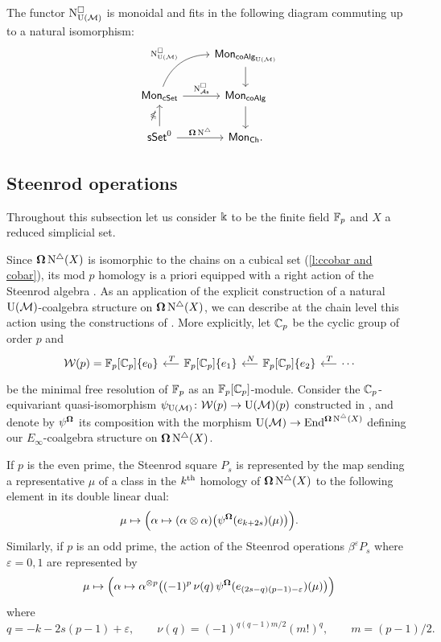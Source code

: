 \begin{lemma} \label{l:lift of cobar to e-infty}
	The functor $\operatorname{N^{\square}_{{\operatorname{U}(\mathcal{M})}}}$ is monoidal and fits in the following diagram commuting up to a natural isomorphism:
	\[
	\begin{tikzcd}
	& \Mon_{\coAlg_\UM} \arrow[d] \\
	\Mon_{\cSet} \arrow[ru, "\cchainsUM", out=70, in=180] \arrow[r, "\cchainsAs"]
	& \Mon_{\coAlg} \arrow[d] \\
	\sSet^0 \arrow[r, "\cobar \schains"] \arrow[u, "\ccobar"]
	& \Mon_{\Ch}.
	\end{tikzcd}
	\]
\end{lemma}

\subsection{Steenrod operations}

Throughout this subsection let us consider $\Bbbk$ to be the finite field ${\mathbb{F}_p}$ and $X$ a reduced simplicial set.

Since $\operatorname{\mathbf{\Omega}} \operatorname{N^{\triangle}}(X)$ is isomorphic to the chains on a cubical set (\cref{l:ccobar and cobar}), its mod $p$ homology is a priori equipped with a right action of the Steenrod algebra \cite{steenrod1962cohomology, milnor1958steenrod}.
As an application of the explicit construction of a natural ${\operatorname{U}(\mathcal{M})}$-coalgebra structure on $\operatorname{\mathbf{\Omega}} \operatorname{N^{\triangle}}(X)$, we can describe at the chain level this action using the constructions of \cite{medina2020maysteenrod}.
More explicitly, let ${\mathbb{C}_p}$ be the cyclic group of order $p$ and
\[
\begin{tikzcd} [column sep = .5cm]
\cW(p) = \Fp[\Cp]\{e_0\} & \arrow[l, "\,T"'] \Fp[\Cp]\{e_1\} & \arrow[l, "\,N"'] \Fp[\Cp]\{e_2\} & \arrow[l, "\,T"'] \dotsb
\end{tikzcd}
\]
be the minimal free resolution of ${\mathbb{F}_p}$ as an ${\mathbb{F}_p}[{\mathbb{C}_p}]$-module.
Consider the ${\mathbb{C}_p}$-equivariant quasi-isomorphism $\psi_{\operatorname{U}(\mathcal{M})} \colon \mathcal{W}(p) \to {\operatorname{U}(\mathcal{M})}(p)$ constructed in \cite{medina2020maysteenrod}, and denote by $\psi^{\operatorname{\mathbf{\Omega}}}$ its composition with the morphism ${\operatorname{U}(\mathcal{M})} \to \mathrm{End}^{\operatorname{\mathbf{\Omega}} \operatorname{N^{\triangle}}(X)}$ defining our $E_\infty$-coalgebra structure on $\operatorname{\mathbf{\Omega}} \operatorname{N^{\triangle}}(X)$.

If $p$ is the even prime, the Steenrod square $P_s$ is represented by the map sending a representative $\mu$ of a class in the $k^{\mathrm{th}}$ homology of $\operatorname{\mathbf{\Omega}} \operatorname{N^{\triangle}}(X)$ to the following element in its double linear dual:
\[
\mu \mapsto
\Big( \alpha \mapsto (\alpha \otimes \alpha) \big( \psi^{\operatorname{\mathbf{\Omega}}}(e_{k+2s})(\mu) \big) \Big).
\]
Similarly, if $p$ is an odd prime, the action of the Steenrod operations $\beta^\varepsilon P_{s}$ where $\varepsilon = 0,1$ are represented by
\[
\mu \mapsto
\Big( \alpha \mapsto \alpha^{\otimes p} \big( (-1)^p \, \nu(q) \, \psi^{\operatorname{\mathbf{\Omega}}}(e_{(2s-q)(p-1)-\varepsilon})(\mu) \big) \Big)
\]
where
\[
q = -k -2s(p-1)+\varepsilon, \qquad
\nu(q) = (-1)^{q(q-1)m/2}(m!)^q, \qquad
m = (p-1)/2.
\]

